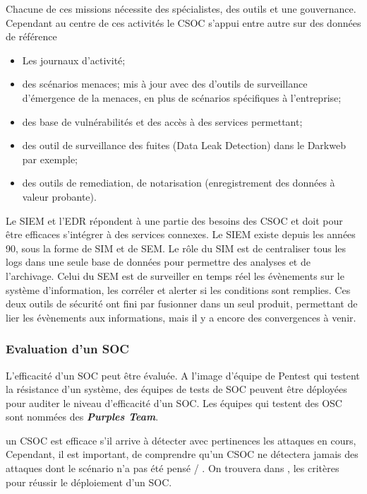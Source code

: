 Chacune de ces missions nécessite des spécialistes, des outils et une gouvernance. Cependant au centre de ces activités  le CSOC s’appui entre autre sur des données de référence
\begin{itemize}
  \item Les journaux d'activité;
  \item des scénarios menaces; mis à jour avec des d'outils de surveillance d'émergence de la menaces, en plus de scénarios spécifiques à l'entreprise;
  \item des base de vulnérabilités et des accès à des services permettant;
  \item des outil de surveillance des fuites (Data Leak Detection) dans le Darkweb par exemple;
  \item des outils de remediation, de notarisation (enregistrement des données à valeur probante).
\end{itemize}

Le SIEM et l'EDR répondent à une partie des besoins des CSOC et doit pour être efficaces s'intégrer à des services connexes.
Le SIEM existe depuis les années 90, sous la forme de SIM et de SEM. Le rôle du SIM est de centraliser tous les logs dans une seule base de données pour permettre des analyses et de l’archivage. Celui du SEM est de surveiller en temps réel les évènements sur le système d’information, les corréler et alerter si les conditions sont remplies. Ces deux outils de sécurité ont fini par fusionner dans un seul produit, permettant de lier les évènements aux informations, mais il y a encore des convergences à venir.

\subsubsection{Evaluation d'un SOC}

L'efficacité d'un SOC peut être évaluée. A l'image d'équipe de Pentest qui testent la résistance d'un système, des équipes de tests de SOC peuvent être déployées pour auditer le niveau d'efficacité d'un SOC.
Les équipes qui testent des OSC sont nommées des \textbf{\textit{Purples Team}}.

un CSOC est efficace s’il arrive à détecter avec pertinences les attaques en cours,  Cependant, il est important, de comprendre qu’un CSOC ne détectera jamais  des attaques dont le scénario n'a pas été pensé / . On trouvera dans , les critères pour réussir le déploiement d'un SOC.

